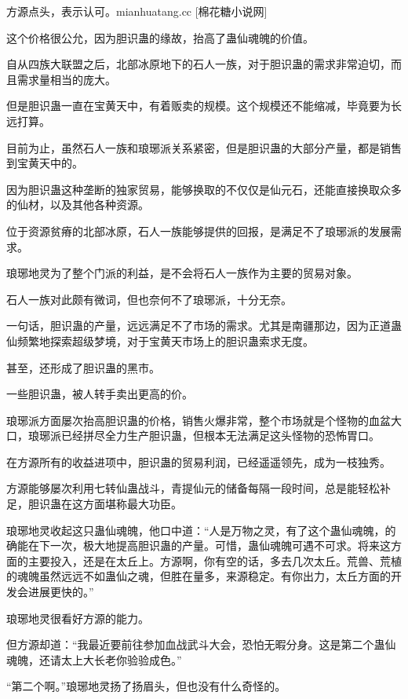 
\begin{this_body}

方源点头，表示认可。mianhuatang.cc [棉花糖小说网]

这个价格很公允，因为胆识蛊的缘故，抬高了蛊仙魂魄的价值。

自从四族大联盟之后，北部冰原地下的石人一族，对于胆识蛊的需求非常迫切，而且需求量相当的庞大。

但是胆识蛊一直在宝黄天中，有着贩卖的规模。这个规模还不能缩减，毕竟要为长远打算。

目前为止，虽然石人一族和琅琊派关系紧密，但是胆识蛊的大部分产量，都是销售到宝黄天中的。

因为胆识蛊这种垄断的独家贸易，能够换取的不仅仅是仙元石，还能直接换取众多的仙材，以及其他各种资源。

位于资源贫瘠的北部冰原，石人一族能够提供的回报，是满足不了琅琊派的发展需求。

琅琊地灵为了整个门派的利益，是不会将石人一族作为主要的贸易对象。

石人一族对此颇有微词，但也奈何不了琅琊派，十分无奈。

一句话，胆识蛊的产量，远远满足不了市场的需求。尤其是南疆那边，因为正道蛊仙频繁地探索超级梦境，对于宝黄天市场上的胆识蛊索求无度。

甚至，还形成了胆识蛊的黑市。

一些胆识蛊，被人转手卖出更高的价。

琅琊派方面屡次抬高胆识蛊的价格，销售火爆非常，整个市场就是个怪物的血盆大口，琅琊派已经拼尽全力生产胆识蛊，但根本无法满足这头怪物的恐怖胃口。

在方源所有的收益进项中，胆识蛊的贸易利润，已经遥遥领先，成为一枝独秀。

方源能够屡次利用七转仙蛊战斗，青提仙元的储备每隔一段时间，总是能轻松补足，胆识蛊在这方面堪称最大功臣。

琅琊地灵收起这只蛊仙魂魄，他口中道：“人是万物之灵，有了这个蛊仙魂魄，的确能在下一次，极大地提高胆识蛊的产量。可惜，蛊仙魂魄可遇不可求。将来这方面的主要投入，还是在太丘上。方源啊，你有空的话，多去几次太丘。荒兽、荒植的魂魄虽然远远不如蛊仙之魂，但胜在量多，来源稳定。有你出力，太丘方面的开发会进展更快的。”

琅琊地灵很看好方源的能力。

但方源却道：“我最近要前往参加血战武斗大会，恐怕无暇分身。这是第二个蛊仙魂魄，还请太上大长老你验验成色。”

“第二个啊。”琅琊地灵扬了扬眉头，但也没有什么奇怪的。


\end{this_body}
